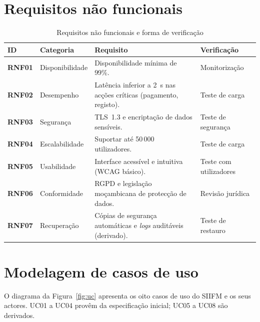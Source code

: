 \documentclass[12pt,a4paper,openany]{report}
\begin{document}
\section{Requisitos não funcionais}
\begin{table}[!htbp]
\caption{Requisitos não funcionais e forma de verificação}\label{tab:rnf}
\begingroup\singlespacing\small
\begin{tabularx}{\textwidth}{@{}>{\bfseries}p{1.5cm}p{2.6cm}Xp{3cm}@{}}
\toprule
ID & Categoria & Requisito & Verificação \\
\midrule
RNF01 & Disponibilidade & Disponibilidade mínima de 99\%. & Monitorização \\
RNF02 & Desempenho & Latência inferior a 2~s nas acções críticas (pagamento, registo). & Teste de carga \\
RNF03 & Segurança & TLS~1.3 e encriptação de dados sensíveis. & Teste de segurança \\
RNF04 & Escalabilidade & Suportar até 50\,000 utilizadores. & Teste de carga \\
RNF05 & Usabilidade & Interface acessível e intuitiva (WCAG básico). & Teste com utilizadores \\
RNF06 & Conformidade & RGPD e legislação moçambicana de protecção de dados. & Revisão jurídica \\
RNF07 & Recuperação & Cópias de segurança automáticas e \emph{logs} auditáveis (derivado). & Teste de restauro \\
\bottomrule
\end{tabularx}
\endgroup
\end{table}

\section{Modelagem de casos de uso}
O diagrama da Figura~\ref{fig:uc} apresenta os oito casos de uso do SIIFM e os seus actores. UC01 a UC04 provêm da especificação inicial; UC05 a UC08 são derivados.
\end{document}
